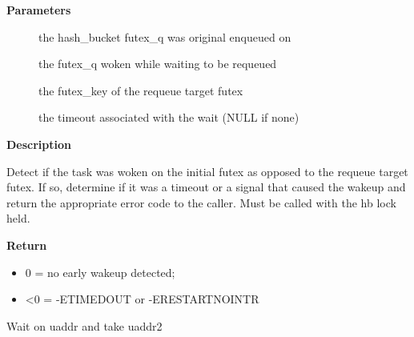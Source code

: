 \documentclass[a4paper,8pt,english]{sphinxmanual}
\begin{document}
\textbf{Parameters}
\begin{description}
\item[{}] \leavevmode
the hash\_bucket futex\_q was original enqueued on

\item[{}] \leavevmode
the futex\_q woken while waiting to be requeued

\item[{}] \leavevmode
the futex\_key of the requeue target futex

\item[{}] \leavevmode
the timeout associated with the wait (NULL if none)

\end{description}

\textbf{Description}

Detect if the task was woken on the initial futex as opposed to the requeue
target futex.  If so, determine if it was a timeout or a signal that caused
the wakeup and return the appropriate error code to the caller.  Must be
called with the hb lock held.

\textbf{Return}
\begin{itemize}
\item {} 
0 = no early wakeup detected;

\item {} 
\textless{}0 = -ETIMEDOUT or -ERESTARTNOINTR

\end{itemize}

\begin{fulllineitems}
\label{kernel-hacking/locking:c.futex_wait_requeue_pi}
Wait on uaddr and take uaddr2

\end{fulllineitems}
\end{document}

